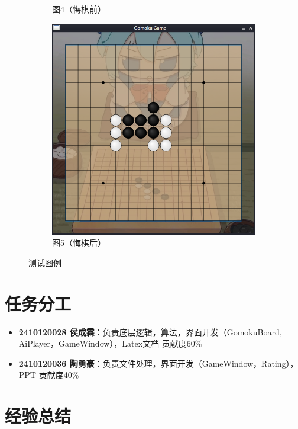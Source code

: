 \documentclass[UTF8]{ctexart}
\begin{document}
\begin{figure}[htbp]
\begin{subfigure}[b]{0.3\textwidth}
        \caption{图4（悔棋前）}
        \label{fig:image4}
    \end{subfigure}%
        \hfill
    \begin{subfigure}[b]{0.3\textwidth}
        \centering
        \includegraphics[width=\textwidth]{screenshoot5.png}
        \caption{图5（悔棋后）}
        \label{fig:image5}
    \end{subfigure}
    \caption{测试图例}
    \label{fig:allimages}
\end{figure}

\section{任务分工}
\begin{itemize}
    \item \textbf{2410120028 侯成霖}：负责底层逻辑，算法，界面开发（GomokuBoard, AiPlayer，GameWindow），Latex文档 贡献度60\%
    \item \textbf{2410120036 陶勇豪}：负责文件处理，界面开发（GameWindow，Rating），PPT 贡献度40\%
\end{itemize}

\section{经验总结}
\end{document}

